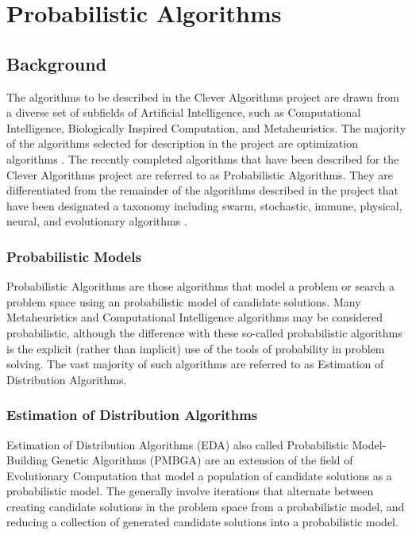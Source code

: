 \documentclass[a4paper, 11pt]{article}
\begin{document}
% 
% 
\section{Probabilistic Algorithms}
\label{sec:algorithms}

% 
% 
\subsection{Background}
The algorithms to be described in the Clever Algorithms project are drawn from a diverse set of subfields of Artificial Intelligence, such as Computational Intelligence, Biologically Inspired Computation, and Metaheuristics. The majority of the algorithms selected for description in the project are optimization algorithms \cite{Brownlee2010b}. 
The recently completed algorithms that have been described for the Clever Algorithms project are referred to as Probabilistic Algorithms. They are differentiated from the remainder of the algorithms described in the project that have been designated a taxonomy including swarm, stochastic, immune, physical, neural, and evolutionary algorithms \cite{Brownlee2010b}. 

\subsubsection{Probabilistic Models}
Probabilistic Algorithms are those algorithms that model a problem or search a problem space using an probabilistic model of candidate solutions. Many Metaheuristics and Computational Intelligence algorithms may be considered probabilistic, although the difference with these so-called probabilistic algorithms is the explicit (rather than implicit) use of the tools of probability in problem solving. The vast majority of such algorithms are referred to as Estimation of Distribution Algorithms.

\subsubsection{Estimation of Distribution Algorithms}
Estimation of Distribution Algorithms (EDA) also called Probabilistic Model-Building Genetic Algorithms (PMBGA) are an extension of the field of Evolutionary Computation that model a population of candidate solutions as a probabilistic model. The generally involve iterations that alternate between creating candidate solutions in the problem space from a probabilistic model, and reducing a collection of generated candidate solutions into a probabilistic model. 
\end{document}
